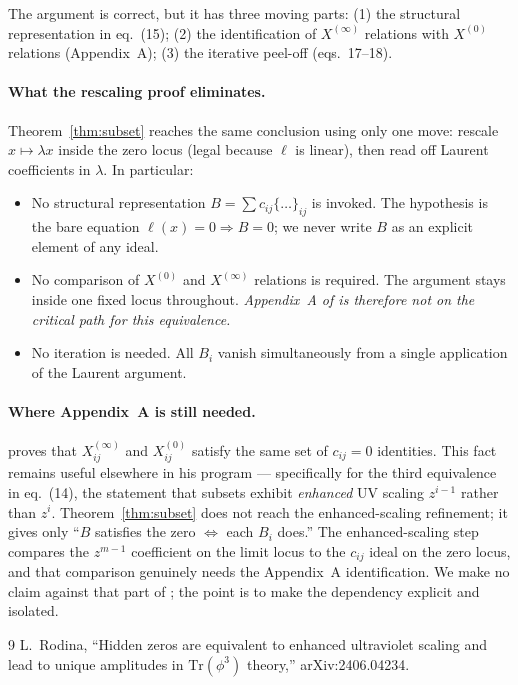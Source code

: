 \documentclass[11pt]{article}
\theoremstyle{definition}
\newcommand{\Tr}{\mathrm{Tr}}
\begin{document}
The argument is correct, but it has three moving parts: (1) the structural representation in eq.~(15); (2) the identification of $X^{(\infty)}$ relations with $X^{(0)}$ relations (Appendix~A); (3) the iterative peel-off (eqs.~17--18).

\paragraph{What the rescaling proof eliminates.}
Theorem~\ref{thm:subset} reaches the same conclusion using only one move: rescale $x \mapsto \lambda x$ inside the zero locus (legal because $\ell$ is linear), then read off Laurent coefficients in $\lambda$. In particular:
\begin{itemize}
  \item No structural representation $B = \sum c_{ij}\{\dots\}_{ij}$ is invoked. The hypothesis is the bare equation $\ell(x) = 0 \Rightarrow B = 0$; we never write $B$ as an explicit element of any ideal.
  \item No comparison of $X^{(0)}$ and $X^{(\infty)}$ relations is required. The argument stays inside one fixed locus throughout. \emph{Appendix~A of \cite{Rodina} is therefore not on the critical path for this equivalence.}
  \item No iteration is needed. All $B_i$ vanish simultaneously from a single application of the Laurent argument.
\end{itemize}

\paragraph{Where Appendix~A is still needed.}
\cite[Appendix~A]{Rodina} proves that $X^{(\infty)}_{ij}$ and $X^{(0)}_{ij}$ satisfy the same set of $c_{ij}=0$ identities. This fact remains useful elsewhere in his program --- specifically for the third equivalence in eq.~(14), the statement that subsets exhibit \emph{enhanced} UV scaling $z^{i-1}$ rather than $z^i$. Theorem~\ref{thm:subset} does not reach the enhanced-scaling refinement; it gives only ``$B$ satisfies the zero $\Leftrightarrow$ each $B_i$ does.'' The enhanced-scaling step compares the $z^{m-1}$ coefficient on the limit locus to the $c_{ij}$ ideal on the zero locus, and that comparison genuinely needs the Appendix~A identification. We make no claim against that part of \cite{Rodina}; the point is to make the dependency explicit and isolated.

\begin{thebibliography}{9}
 L.~Rodina, ``Hidden zeros are equivalent to enhanced ultraviolet scaling and lead to unique amplitudes in $\Tr(\phi^3)$ theory,'' arXiv:2406.04234.
\end{thebibliography}
\end{document}
